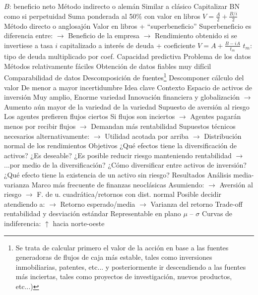 \documentclass{nuevotema}
\begin{document}
\begin{esquemal}
				\4[] $B$: beneficio neto
				\4 Método indirecto o alemán
				\4[] Similar a clásico
				\4[] Capitalizar BN como si perpetuidad
				\4[] Suma ponderada al 50\% con valor en libros
				\4[] $V = \frac{A}{2} + \frac{B/i}{2}$
				\4 Método directo o anglosajón
				\4[] Valor en libros + ``superbeneficio''
				\4[] Superbeneficio es diferencia entre:
				\4[] $\to$ Beneficio de la empresa
				\4[] $\to$ Rendimiento obtenido si se invertiese a tasa $i$
				\4[] \quad capitalizado a interés de deuda + coeficiente
				\4[] $V = A + \frac{B-iA}{t_m}$
				\4[] $t_m$: tipo de deuda multiplicado por coef.
		\2 Capacidad predictiva
			\3 Problema de los datos
				\4 Métodos relativamente fáciles
				\4 Obtención de datos fiables muy difícil
				\4 Comparabilidad de datos
			\3 Descomposición de fuentes\footnote{Se trata de calcular primero el valor de la acción en base a las fuentes generadoras de flujos de caja más estable, tales como inversiones inmobiliarias, patentes, etc... y posteriormente ir descendiendo a las fuentes más inciertas, tales como proyectos de investigación, nuevos productos, etc...)}
				\4 Descomponer cálculo del valor
				\4 De menor a mayor incertidumbre
	\1 
		\2 Idea clave
			\3 Contexto
				\4 Espacio de activos de inversión
				\4[] Muy amplio, Enorme variedad
				\4[] Innovación financiera y globalización
				\4[] $\to$ Aumento aún mayor de la variedad de la variedad
				\4 Supuesto de aversión al riesgo
				\4[] Los agentes prefieren flujos ciertos
				\4[] Si flujos son inciertos
				\4[] $\to$ Agentes pagarán menos por recibir flujos
				\4[] $\to$ Demandan más rentabilidad
				\4[] Supuestos técnicos necesarios alternativamente:
				\4[] $\to$ Utilidad acotada por arriba
				\4[] $\to$ Distribución normal de los rendimientos
			\3 Objetivos
				\4 ¿Qué efectos tiene la diversificación de activos?
				\4 ¿Es deseable?
				\4[] ¿Es posible reducir riesgo manteniendo rentabilidad
				\4[] $\to$ ...por medio de la diversificación?
				\4 ¿Cómo diversificar entre activos de inversión?
				\4 ¿Qué efecto tiene la existencia de un activo sin riesgo?
			\3 Resultados
				\4 Análisis media-varianza
				\4[] Marco más frecuente de finanzas neoclásicas
				\4[] Asumiendo:
				\4[] $\to$ Aversión al riesgo
				\4[] $\to$ F. de u. cuadrática/retornos con dist. normal
				\4[] Posible decidir atendiendo a:
				\4[] $\to$ Retorno esperado/media
				\4[] $\to$ Varianza del retorno
				\4 Trade-off rentabilidad y desviación estándar
				\4[] Representable en plano $\mu$ -- $\sigma$
				\4[] Curvas de indiferencia: $\uparrow$ hacia norte-oeste

\end{esquemal}
\end{document}
